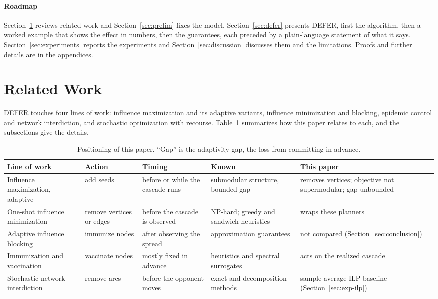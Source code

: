 \documentclass[preprint,11pt]{elsarticle}
\theoremstyle{definition}
\theoremstyle{remark}
\newcommand{\up}{\rule{0pt}{2.6ex}}
\begin{document}
\paragraph{Roadmap} Section~\ref{sec:related} reviews related work and Section~\ref{sec:prelim} fixes the model. Section~\ref{sec:defer} presents DEFER, first the algorithm, then a worked example that shows the effect in numbers, then the guarantees, each preceded by a plain-language statement of what it says. Section~\ref{sec:experiments} reports the experiments and Section~\ref{sec:discussion} discusses them and the limitations. Proofs and further details are in the appendices.

\section{Related Work}\label{sec:related}

DEFER touches four lines of work: influence maximization and its adaptive variants, influence minimization and blocking, epidemic control and network interdiction, and stochastic optimization with recourse. Table~\ref{tab:related} summarizes how this paper relates to each, and the subsections give the details.

\begin{table}[h]
\centering
\caption{Positioning of this paper. ``Gap'' is the adaptivity gap, the loss from committing in advance.}\label{tab:related}
\small
\begin{tabular}{@{}>{\raggedright\arraybackslash}p{}>{\raggedright\arraybackslash}p{}>{\raggedright\arraybackslash}p{}>{\raggedright\arraybackslash}p{}>{\raggedright\arraybackslash}p{}@{}}
\hline
\up Line of work & Action & Timing & Known & This paper \\
\hline
\up Influence maximization, adaptive & add seeds & before or while the cascade runs & submodular structure, bounded gap & removes vertices; objective not supermodular; gap unbounded \\
One-shot influence minimization & remove vertices or edges & before the cascade is observed & NP-hard; greedy and sandwich heuristics & wraps these planners \\
Adaptive influence blocking & immunize nodes & after observing the spread & approximation guarantees \citep{shi2019} & not compared (Section~\ref{sec:conclusion}) \\
Immunization and vaccination & vaccinate nodes & mostly fixed in advance & heuristics and spectral surrogates & acts on the realized cascade \\
Stochastic network interdiction & remove arcs & before the opponent moves & exact and decomposition methods & sample-average ILP baseline (Section~\ref{sec:exp-ilp}) \\
\hline
\end{tabular}
\end{table}
\end{document}
